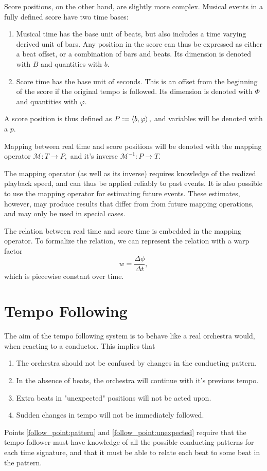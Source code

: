 Score positions, on the other hand,
are slightly more complex.
Musical events in a fully defined score have two time bases:
\begin{enumerate}
\item Musical time has the base unit of beats, but also includes a time varying derived unit of bars. Any position in the score can thus be expressed as either a beat offset, or a combination of bars and beats. Its dimension is denoted with $B$ and quantities with $b$.
\item Score time has the base unit of seconds. This is an offset from the beginning of the score if the original tempo is followed. Its dimension is denoted with $\Phi$ and quantities with $\varphi$.
\end{enumerate}
A score position is thus defined as
$ P := \left \langle b, \varphi \right \rangle , $
and variables will be denoted with a $p$.

Mapping between real time and score positions will be denoted with
the mapping operator
$ \mathcal{M} : T \rightarrow P, $
and it's inverse
$ \mathcal{M}^{-1} : P \rightarrow T. $

The mapping operator (as well as its inverse)
requires knowledge of
the realized playback speed,
and can thus be applied reliably to
past events.
It is also possible to use the mapping operator for
estimating future events.
These estimates, however,
may produce results that differ from
from future mapping operations,
and may only be used in special cases.

The relation between real time and score time
is embedded in the mapping operator.
To formalize the relation, we can
represent the relation with a warp factor
\begin{equation}
w = \frac{\Delta \phi}{\Delta t},
\end{equation}
which is piecewise constant over time.
 

\section{Tempo Following}

The aim of the tempo following system
is to behave like a real orchestra would,
when reacting to a conductor.
This implies that
\begin{enumerate}
\item The orchestra should not be confused by changes in the conducting pattern. \label{follow_point:pattern}
\item In the absence of beats, the orchestra will continue with it's previous tempo.
\item Extra beats in "unexpected" positions will not be acted upon. \label{follow_point:unexpected}
\item Sudden changes in tempo will not be immediately followed.
\end{enumerate}
Points \ref{follow_point:pattern} and \ref{follow_point:unexpected} require
that the tempo follower must have knowledge of all the possible
conducting patterns for each time signature,
and that it must be able to relate each beat to some beat in the pattern.

